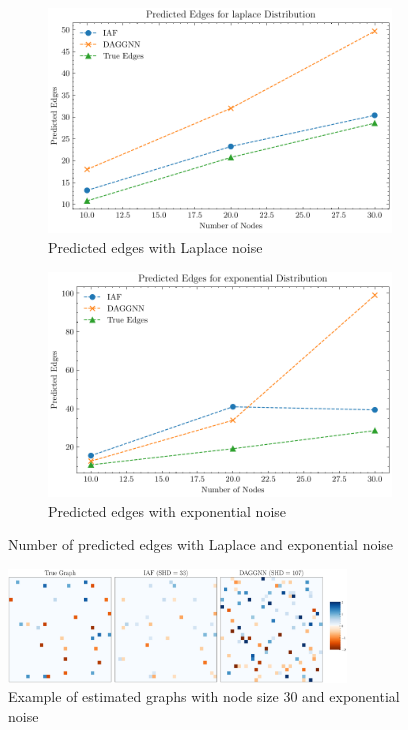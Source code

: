 \documentclass[10pt]{article}
\begin{document}
\begin{figure}[H]
    \centering
    \begin{subfigure}{0.45\textwidth}
        \includegraphics[width=\textwidth]{fig/Predicted Edges_independence_laplace.pdf}
        \caption{Predicted edges with Laplace noise}
        \label{pred_edge_laplace}
    \end{subfigure}
    \hfill
    \begin{subfigure}{0.45\textwidth}
        \includegraphics[width=\textwidth]{fig/Predicted Edges_independence_exponential.pdf}
        \caption{Predicted edges with exponential noise}
        \label{pred_edge_exponential}
    \end{subfigure}
    \caption{Number of predicted edges with Laplace and exponential noise}
    \label{pred_edge_laplace_exponential}
\end{figure}

\begin{figure}[H]
    \centering
    \includegraphics[width=0.8\textwidth]{fig/comparison_indep_30_exponential_seed301.pdf}
    \caption{Example of estimated graphs with node size 30 and exponential noise}
    \label{example_graphs_indep}
\end{figure}
\end{document}
